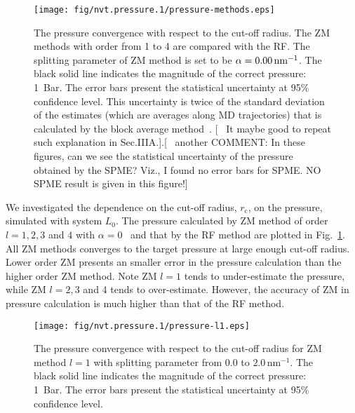 \documentclass[a4paper,preprint,unsortedaddress,onecolumn,fleqn]{revtex4}
\newcommand{\recheck}[1]{{\color{red} #1}}
\begin{document}
\begin{figure}[tbp]
\centering
\texttt{[image: fig/nvt.pressure.1/pressure-methods.eps]}
\caption{The pressure convergence with respect to the cut-off radius. The ZM
methods with order from 1 to 4 are compared with the RF. The splitting
parameter of ZM method is set to be $\protect\alpha =0.00\,\text{nm}^{-1}$.
The black solid line indicates the magnitude of the correct pressure: 1~Bar.
The error bars present the statistical uncertainty at 95\% confidence level. 
{\color{red} This uncertainty is twice of the standard deviation of the
estimates (which are averages along MD trajectories) that is calculated by
the block average method~\protect\cite{janke2002statistical}.} [ {\ 
\color{blue}It maybe good to repeat such explanation in Sec.IIIA.}].[{\ 
\color{blue} another COMMENT: In these figures, can we see the statistical
uncertainty of the pressure obtained by the SPME? Viz., I found no error
bars for SPME.} \recheck{NO SPME result is given in this figure!}]}
\label{fig:pres-comp}
\end{figure}

We investigated the dependence on the cut-off radius, $r_{\text{c}}$, on the
pressure, simulated with system $L_{0}$. The pressure calculated by ZM
method of order $l=1,2,3$ and $4$ with $\alpha =0$ \ and that by the RF
method are plotted in Fig.~\ref{fig:pres-comp}. All ZM methods converges to
the target pressure at large enough cut-off radius. Lower order ZM presents
an smaller error in the pressure calculation than the higher order ZM
method. Note ZM $l=1$ tends to under-estimate the pressure, while ZM $l=2,3$
and 4 tends to over-estimate. However, the accuracy of ZM in pressure
calculation is much higher than that of the RF method.

\begin{figure}[tbp]
\centering
\texttt{[image: fig/nvt.pressure.1/pressure-l1.eps]} %
\caption{ The pressure convergence with respect to the cut-off radius for ZM
method $l=1$ with splitting parameter from $0.0$ to $2.0\,\text{nm}^{-1}$.
The black solid line indicates the magnitude of the correct pressure: 1~Bar.
The error bars present the statistical uncertainty at 95\% confidence level.}
\label{fig:pres-l1}
\end{figure}
\end{document}
